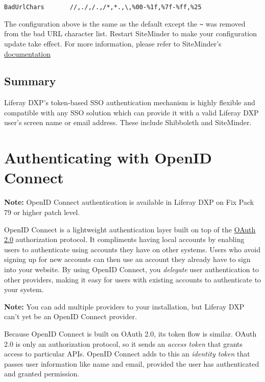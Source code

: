 \begin{verbatim}
BadUrlChars       //,./,/.,/*,*.,\,%00-%1f,%7f-%ff,%25
\end{verbatim}

The configuration above is the same as the default except the
\texttt{\textasciitilde{}} was removed from the bad URL character list.
Restart SiteMinder to make your configuration update take effect. For
more information, please refer to SiteMinder's
\href{https://support.ca.com/cadocs/0/CA\%20SiteMinder\%20r6\%200\%20SP6-ENU/Bookshelf_Files/HTML/index.htm?toc.htm?258201.html}{documentation}

\subsection{Summary}\label{summary-2}

Liferay DXP's token-based SSO authentication mechanism is highly
flexible and compatible with any SSO solution which can provide it with
a valid Liferay DXP user's screen name or email address. These include
Shibboleth and SiteMinder.

\section{Authenticating with OpenID
Connect}\label{authenticating-with-openid-connect}

\noindent\hrulefill

\textbf{Note:} OpenID Connect authentication is available in Liferay DXP
on Fix Pack 79 or higher patch level.

\noindent\hrulefill

OpenID Connect is a lightweight authentication layer built on top of the
\href{https://oauth.net/2/}{OAuth 2.0} authorization protocol. It
compliments having local accounts by enabling users to authenticate
using accounts they have on other systems. Users who avoid signing up
for new accounts can then use an account they already have to sign into
your website. By using OpenID Connect, you \emph{delegate} user
authentication to other providers, making it easy for users with
existing accounts to authenticate to your system.

\noindent\hrulefill

\textbf{Note:} You can add multiple providers to your installation, but
Liferay DXP can't yet be an OpenID Connect provider.

\noindent\hrulefill

Because OpenID Connect is built on OAuth 2.0, its token flow is similar.
OAuth 2.0 is only an authorization protocol, so it sends an \emph{access
token} that grants access to particular APIs. OpenID Connect adds to
this an \emph{identity token} that passes user information like name and
email, provided the user has authenticated and granted permission.

